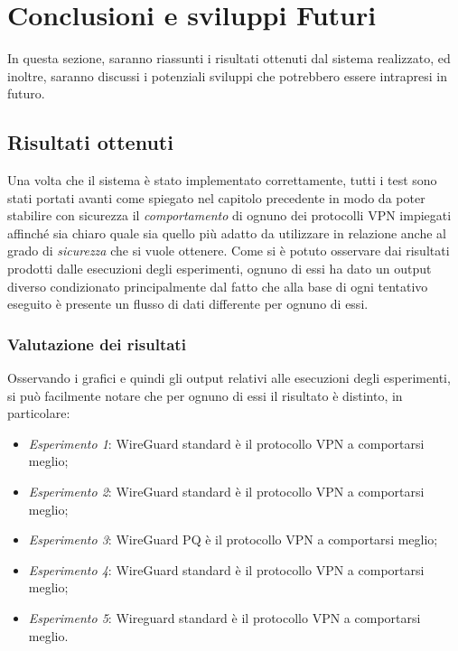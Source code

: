 \chapter{Conclusioni e sviluppi Futuri} %
%


\begin{citazione}
In questa sezione, saranno riassunti i risultati ottenuti dal sistema realizzato, ed inoltre, saranno discussi i potenziali sviluppi che potrebbero essere intrapresi in futuro.
\end{citazione}
\newpage

\section{Risultati ottenuti}
Una volta che il sistema è stato implementato correttamente, tutti i test sono stati portati avanti come spiegato nel capitolo precedente in modo da poter stabilire con sicurezza il \emph{comportamento} di ognuno dei protocolli VPN impiegati affinché sia chiaro quale sia quello più adatto da utilizzare in relazione anche al grado di \emph{sicurezza} che si vuole ottenere. Come si è potuto osservare dai risultati prodotti dalle esecuzioni degli esperimenti, ognuno di essi ha dato un output diverso condizionato principalmente dal fatto che alla base di ogni tentativo eseguito è presente un flusso di dati differente per ognuno di essi.

\subsection{Valutazione dei risultati}
Osservando i grafici e quindi gli output relativi alle esecuzioni degli esperimenti, si può facilmente notare che per ognuno di essi il risultato è distinto, in particolare:
\begin{itemize}
    \item \emph{Esperimento 1}: WireGuard standard è il protocollo VPN a comportarsi meglio;
    \item \emph{Esperimento 2}: WireGuard standard è il protocollo VPN a comportarsi meglio;
    \item \emph{Esperimento 3}: WireGuard PQ è il protocollo VPN a comportarsi meglio;
    \item \emph{Esperimento 4}: WireGuard standard è il protocollo VPN a comportarsi meglio;
    \item \emph{Esperimento 5}: Wireguard standard è il protocollo VPN a comportarsi meglio.
\end{itemize}


